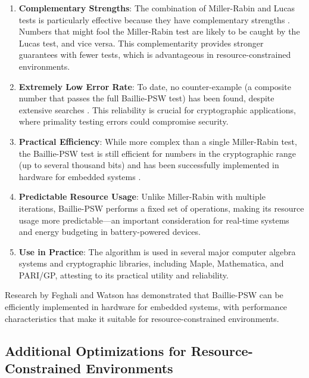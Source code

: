 \begin{enumerate}
    \item \textbf{Complementary Strengths}: The combination of Miller-Rabin and Lucas tests is particularly effective because they have complementary strengths \cite{taxonomy_primality}. Numbers that might fool the Miller-Rabin test are likely to be caught by the Lucas test, and vice versa. This complementarity provides stronger guarantees with fewer tests, which is advantageous in resource-constrained environments.
    
    \item \textbf{Extremely Low Error Rate}: To date, no counter-example (a composite number that passes the full Baillie-PSW test) has been found, despite extensive searches \cite{pomerance1984}. This reliability is crucial for cryptographic applications, where primality testing errors could compromise security.
    
    \item \textbf{Practical Efficiency}: While more complex than a single Miller-Rabin test, the Baillie-PSW test is still efficient for numbers in the cryptographic range (up to several thousand bits) and has been successfully implemented in hardware for embedded systems \cite{hardware_baillie}.
    
    \item \textbf{Predictable Resource Usage}: Unlike Miller-Rabin with multiple iterations, Baillie-PSW performs a fixed set of operations, making its resource usage more predictable—an important consideration for real-time systems and energy budgeting in battery-powered devices.
    
    \item \textbf{Use in Practice}: The algorithm is used in several major computer algebra systems and cryptographic libraries, including Maple, Mathematica, and PARI/GP, attesting to its practical utility and reliability.
\end{enumerate}

Research by Feghali and Watson \cite{hardware_baillie} has demonstrated that Baillie-PSW can be efficiently implemented in hardware for embedded systems, with performance characteristics that make it suitable for resource-constrained environments.

\subsection{Additional Optimizations for Resource-Constrained Environments}

